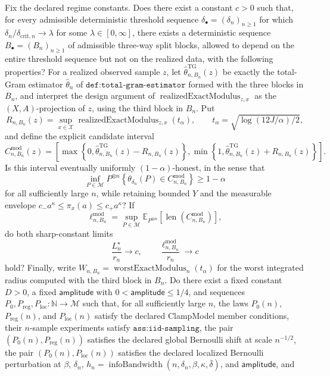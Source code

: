 Fix the declared regime constants.  Does there exist a constant \(c>0\) such that, for every admissible deterministic threshold sequence \(\delta_{\bullet}=(\delta_n)_{n\geq1}\) for which \(\delta_n/\delta_{\mathrm{crit},n}\to\lambda\) for some \(\lambda\in[0,\infty]\), there exists a deterministic sequence \(B_{\bullet}=(B_n)_{n\geq1}\) of admissible three-way split blocks, allowed to depend on the entire threshold sequence but not on the realized data, with the following properties?  For a realized observed sample \(z\), let \(\widehat\theta^{\mathrm{TG}}_{n,B_n}(z)\) be exactly the total-Gram estimator \(\widehat\theta_n\) of \(\texttt{def:total-gram-estimator}\) formed with the three blocks in \(B_n\), and interpret the design argument of \(\operatorname{realizedExactModulus}_{z,x}\) as the \((X,A)\)-projection of \(z\), using the third block in \(B_n\).  Put
\[
 R_{n,B_n}(z)=\sup_{x\in\mathcal X}\operatorname{realizedExactModulus}_{z,x}(t_\alpha),
 \qquad
 t_\alpha=\sqrt{\log(12J/\alpha)/2},
\]
and define the explicit candidate interval
\[
 C^{\mathrm{mod}}_{n,B_n}(z)=
 \left[
 \max\left\{0,\widehat\theta^{\mathrm{TG}}_{n,B_n}(z)-R_{n,B_n}(z)\right\},
 \min\left\{1,\widehat\theta^{\mathrm{TG}}_{n,B_n}(z)+R_{n,B_n}(z)\right\}
 \right].
\]
Is this interval eventually uniformly \((1-\alpha)\)-honest, in the sense that
\[
 \inf_{P\in\mathcal M}P^{\otimes n}
 \left\{\theta_{\delta_n}(P)\in C^{\mathrm{mod}}_{n,B_n}\right\}
 \geq1-\alpha
\]
for all sufficiently large \(n\), while retaining bounded \(Y\) and the measurable envelope \(c_-a^\kappa\leq\pi_x(a)\leq c_+a^\kappa\)?  If
\[
 \ell^{\mathrm{mod}}_{n,B_n}
 =\sup_{P\in\mathcal M}\mathbb E_{P^{\otimes n}}
 \left[\operatorname{len}\!\left(C^{\mathrm{mod}}_{n,B_n}\right)\right],
\]
do both sharp-constant limits
\[
 \frac{L_n^\star}{r_n}\longrightarrow c,
 \qquad
 \frac{\ell^{\mathrm{mod}}_{n,B_n}}{r_n}\longrightarrow c
\]
hold?  Finally, write \(W_{n,B_n}=\operatorname{worstExactModulus}_n(t_\alpha)\) for the worst integrated radius computed with the third block in \(B_n\).  Do there exist a fixed constant \(D>0\), a fixed \(\mathsf{amplitude}\) with \(0<\mathsf{amplitude}\leq1/4\), and sequences \(P_0,P_{\mathrm{reg}},P_{\mathrm{loc}}:\mathbb N\to\mathcal M\) such that, for all sufficiently large \(n\), the laws \(P_0(n)\), \(P_{\mathrm{reg}}(n)\), and \(P_{\mathrm{loc}}(n)\) satisfy the declared ClampModel member conditions, their \(n\)-sample experiments satisfy \(\texttt{ass:iid-sampling}\), the pair \((P_0(n),P_{\mathrm{reg}}(n))\) satisfies the declared global Bernoulli shift at scale \(n^{-1/2}\), the pair \((P_0(n),P_{\mathrm{loc}}(n))\) satisfies the declared localized Bernoulli perturbation at \(\beta\), \(\delta_n\), \(h_n=\operatorname{infoBandwidth}(n,\delta_n,\beta,\kappa,\bar\delta)\), and \(\mathsf{amplitude}\), and
